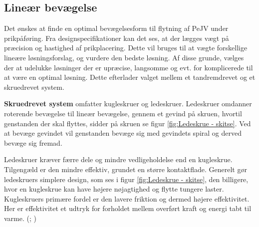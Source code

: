 \subsection{Lineær bevægelse} \label{løsningsanal: Lineær bevægelse}
Det ønskes at finde en optimal bevægelsesform til flytning af PeJV under prikpåføring. Fra designspecifikationer kan det ses, at der lægges vægt på præcision og hastighed af prikplacering. Dette vil bruges til at vægte forskellige lineære løsningsforslag, og vurdere den bedste løsning.
Af disse grunde, vælges der at udelukke løsninger der er upræcise, langsomme og evt. for komplicerede til at være en optimal løsning. Dette efterlader valget mellem et tandremdrevet og et skruedrevet system. \parencite{IndustrialQuickSearch2025LinearPrinciples}

\textbf{Skruedrevet system} omfatter kugleskruer og ledeskruer. Ledeskruer omdanner roterende bevægelse til lineær bevægelse, gennem et gevind på skruen, hvortil genstanden der skal flyttes, sidder på skruen se figur \ref{fig:Ledeskrue - skitse}. Ved at bevæge gevindet vil genstanden bevæge sig med gevindets spiral og derved bevæge sig fremad.

Ledeskruer kræver færre dele og mindre vedligeholdelse end en kugleskrue. Tilgengæld er den mindre effektiv, grundet en større kontaktflade. Generelt gør ledeskruers simplere design, som ses i figur \ref{fig:Ledeskrue - skitse}, den billigere, hvor en kugleskrue kan have højere nøjagtighed og flytte tungere laster. Kugleskruers primære fordel er den lavere friktion og dermed højere effektivitet. Her er effektivitet et udtryk for forholdet mellem overført kraft og energi tabt til varme. (\cite{UniversalThreadGrindingCompany2020PrecisionAssemblies}; \cite{IndustrialQuickSearch2025LeadBenefits})

